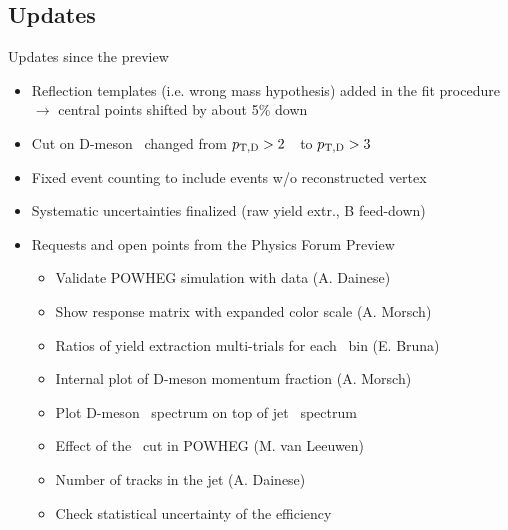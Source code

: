 \documentclass[xcolor={usenames,dvipsnames}]{beamer}
\begin{document}
\subsection{Updates}

\begin{frame}{Updates since the preview}

{\small
\begin{itemize}
\item Reflection templates (i.e. wrong mass hypothesis) added in the fit procedure $\rightarrow$ central points shifted by about 5\% down
\item Cut on D-meson \pt\ changed from $p_{\mathrm{T,D}}>2$~\GeVc\ to $p_{\mathrm{T,D}}>3$~\GeVc\
\item Fixed event counting to include events w/o reconstructed vertex 
\item Systematic uncertainties finalized (raw yield extr., B feed-down)
\item Requests and open points from the Physics Forum Preview
\begin{itemize}
\item Validate POWHEG simulation with data (A. Dainese)
\item Show response matrix with expanded color scale (A. Morsch)
\item Ratios of yield extraction multi-trials for each \ptd\ bin (E. Bruna)
\item Internal plot of D-meson momentum fraction (A. Morsch)
\item Plot D-meson \pt\ spectrum on top of jet \pt\ spectrum
\item Effect of the \ptd\ cut in POWHEG (M. van Leeuwen)
\item Number of tracks in the jet (A. Dainese)
\item Check statistical uncertainty of the efficiency
\end{itemize}
\end{itemize}
}
\end{frame}
\end{document}
